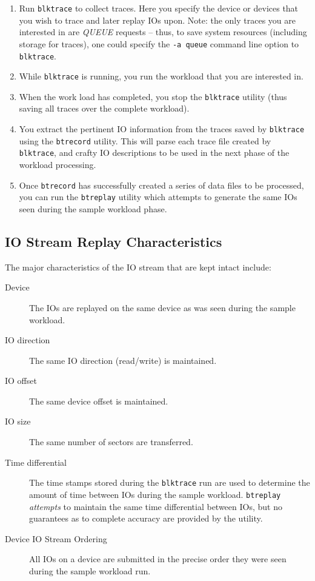 \documentclass{article}
\begin{document}
\begin{enumerate}
  \item Run \texttt{blktrace} to collect traces. Here you specify the
  device or devices that you wish to trace and later replay IOs upon. Note:
  the only traces you are interested in are \emph{QUEUE} requests --
  thus, to save system resources (including storage for traces), one could
  specify the \texttt{-a queue} command line option to \texttt{blktrace}.

  \item While \texttt{blktrace} is running, you run the workload that you
  are interested in. 

  \item When the work load has completed, you stop the \texttt{blktrace}
  utility (thus saving all traces over the complete workload). 

  \item You extract the pertinent IO information from the traces saved by
  \texttt{blktrace} using the \texttt{btrecord} utility. This will parse
  each trace file created by \texttt{blktrace}, and crafty IO descriptions
  to be used in the next phase of the workload processing.

  \item Once \texttt{btrecord} has successfully created a series of data
  files to be processed, you can run the \texttt{btreplay} utility which
  attempts to generate the same IOs seen during the sample workload phase.
\end{enumerate}

\subsection{IO Stream Replay Characteristics}
  The major characteristics of the IO stream that are kept intact include:

  \begin{description}
    \item[Device] The IOs are replayed on the same device as was seen
    during the sample workload.

    \item[IO direction] The same IO direction (read/write) is maintained.

    \item[IO offset] The same device offset is maintained.

    \item[IO size] The same number of sectors are transferred.

    \item[Time differential] The time stamps stored during the
    \texttt{blktrace} run are used to determine the amount of time between
    IOs during the sample workload. \texttt{btreplay} \emph{attempts} to
    maintain the same time differential between IOs, but no guarantees as
    to complete accuracy are provided by the utility.

    \item[Device IO Stream Ordering] All IOs on a device are submitted in
    the precise order they were seen during the sample workload run. 
  \end{description}
\end{document}
